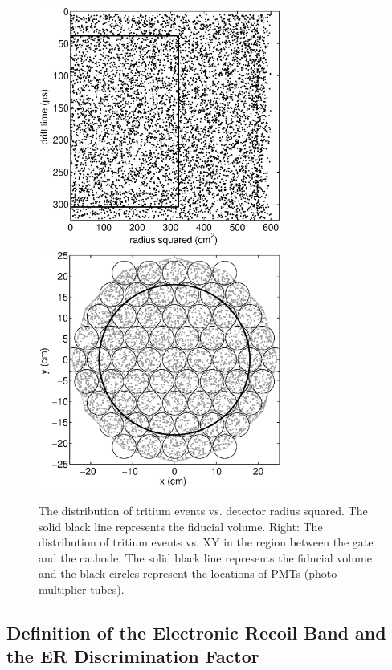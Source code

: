  \renewcommand{\baselinestretch}{1}
\small\normalsize
\begin{figure}[h!]\centering
\includegraphics[width=80mm]{Chapter_T/Figures/CH3T_RZ_scatter_lux10_20130812T1546.eps}
\includegraphics[width=80mm]{Chapter_T/Figures/CH3T_XY_scatter_PMT_lux10_20130812T1546.eps}
\caption{The distribution of tritium events vs. detector radius squared. The solid black line represents the fiducial volume.
 Right: The distribution of tritium events vs. XY in the region between the gate and the cathode. The solid black line represents the fiducial volume and the black circles represent the locations of PMTs (photo multiplier tubes).}
\label{fig:Density}
\end{figure}
\renewcommand{\baselinestretch}{2}
\small\normalsize

\subsection{Definition of the Electronic Recoil Band and the ER Discrimination Factor}

